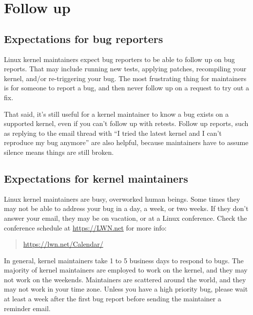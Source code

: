 \documentclass[a4paper,8pt,english]{sphinxmanual}
\begin{document}
\section{Follow up}
\label{admin-guide/reporting-bugs:follow-up}

\subsection{Expectations for bug reporters}
\label{admin-guide/reporting-bugs:expectations-for-bug-reporters}
Linux kernel maintainers expect bug reporters to be able to follow up on
bug reports.  That may include running new tests, applying patches,
recompiling your kernel, and/or re-triggering your bug.  The most
frustrating thing for maintainers is for someone to report a bug, and then
never follow up on a request to try out a fix.

That said, it's still useful for a kernel maintainer to know a bug exists
on a supported kernel, even if you can't follow up with retests.  Follow
up reports, such as replying to the email thread with ``I tried the latest
kernel and I can't reproduce my bug anymore'' are also helpful, because
maintainers have to assume silence means things are still broken.


\subsection{Expectations for kernel maintainers}
\label{admin-guide/reporting-bugs:expectations-for-kernel-maintainers}
Linux kernel maintainers are busy, overworked human beings.  Some times
they may not be able to address your bug in a day, a week, or two weeks.
If they don't answer your email, they may be on vacation, or at a Linux
conference.  Check the conference schedule at \href{https://LWN.net}{https://LWN.net} for more info:
\begin{quote}

\href{https://lwn.net/Calendar/}{https://lwn.net/Calendar/}
\end{quote}

In general, kernel maintainers take 1 to 5 business days to respond to
bugs.  The majority of kernel maintainers are employed to work on the
kernel, and they may not work on the weekends.  Maintainers are scattered
around the world, and they may not work in your time zone.  Unless you
have a high priority bug, please wait at least a week after the first bug
report before sending the maintainer a reminder email.
\end{document}
